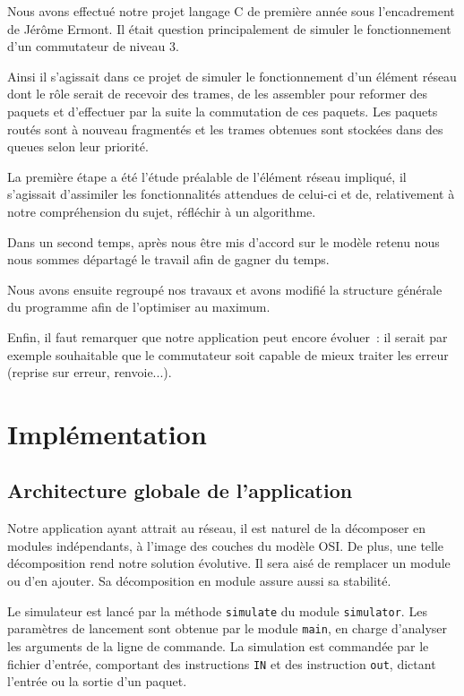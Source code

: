 \documentclass[a4paper,11pt]{article}
\begin{document}
Nous avons effectué notre projet langage C de première année sous
l'encadrement de Jérôme Ermont. Il était question principalement de
simuler le fonctionnement d'un commutateur de niveau 3. 

Ainsi il s'agissait dans ce projet de simuler le fonctionnement d'un élément
réseau dont le rôle serait de recevoir des trames, de les assembler pour
reformer des paquets et d'effectuer par la suite la commutation de ces
paquets. Les paquets routés sont à nouveau fragmentés et les trames
obtenues sont stockées dans des queues selon leur priorité.

La première étape a été l'étude préalable de l'élément réseau impliqué,
il s'agissait d'assimiler les fonctionnalités attendues de celui-ci et
de, relativement à notre compréhension du sujet, réfléchir à un
algorithme.

Dans un second temps, après nous être mis d'accord sur le modèle retenu
nous nous sommes départagé le travail afin de gagner du temps.  

Nous avons ensuite regroupé nos travaux et avons modifié la structure
générale du programme afin de l'optimiser au maximum. 

Enfin, il faut remarquer que notre application peut encore évoluer : il
serait par exemple souhaitable que le commutateur soit capable de mieux
traiter les erreur (reprise sur erreur, renvoie...).

\section{Implémentation}
\subsection{Architecture globale de l'application}

Notre application ayant attrait au réseau, il est naturel de la
décomposer en modules indépendants, à l'image des couches du modèle OSI. De
plus, une telle décomposition rend notre solution évolutive. Il sera
aisé de remplacer un module ou d'en ajouter. Sa décomposition en module
assure aussi sa stabilité.

Le simulateur est lancé par la méthode \texttt{simulate} du module
\texttt{simulator}. Les paramètres de lancement sont obtenue par le
module \texttt{main}, en charge d'analyser les arguments de la ligne de
commande. La simulation est commandée par le fichier d'entrée, comportant
des instructions \texttt{IN} et des instruction \texttt{out}, dictant
l'entrée ou la sortie d'un paquet.
\end{document}
